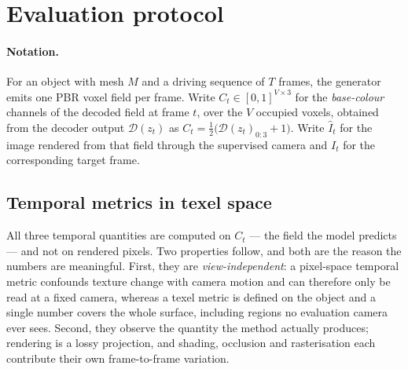 
\section{Evaluation protocol}
\label{sec:metrics}

\paragraph{Notation.}
For an object with mesh $M$ and a driving sequence of $T$ frames, the generator emits
one PBR voxel field per frame. Write $C_t \in [0,1]^{V \times 3}$ for the
\emph{base-colour} channels of the decoded field at frame $t$, over the $V$ occupied
voxels, obtained from the decoder output $\mathcal{D}(z_t)$ as
$C_t = \tfrac{1}{2}\big(\mathcal{D}(z_t)_{0:3} + 1\big)$. Write $\hat{I}_t$ for the
image rendered from that field through the supervised camera and $I_t$ for the
corresponding target frame.

\subsection{Temporal metrics in texel space}

All three temporal quantities are computed on $C_t$ --- the field the model
predicts --- and not on rendered pixels. Two properties follow, and both are the
reason the numbers are meaningful. First, they are \emph{view-independent}: a
pixel-space temporal metric confounds texture change with camera motion and can
therefore only be read at a fixed camera, whereas a texel metric is defined on the
object and a single number covers the whole surface, including regions no evaluation
camera ever sees. Second, they observe the quantity the method actually produces;
rendering is a lossy projection, and shading, occlusion and rasterisation each
contribute their own frame-to-frame variation.

